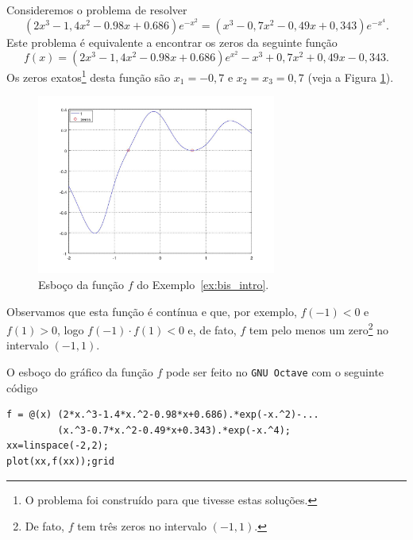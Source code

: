 \begin{ex}\label{ex:bis_intro}
  Consideremos o problema de resolver
  \begin{equation}
    (2x^3-1,4x^2-0.98x+0.686)e^{-x^2} = (x^3-0,7x^2-0,49x+0,343)e^{-x^4}.
  \end{equation}
Este problema é equivalente a encontrar os zeros da seguinte função
\begin{equation}
  f(x) = (2x^3-1,4x^2-0.98x+0.686)e^{x^2} - x^3 + 0,7x^2 + 0,49x - 0,343.
\end{equation}
Os zeros exatos\footnote{O problema foi construído para que tivesse estas soluções.} desta função são $x_1=-0,7$ e $x_2=x_3=0,7$ (veja a Figura \ref{fig:bis_intro}).

\begin{figure}[h!]
  \centering
  \includegraphics[width=0.7\textwidth]{./cap_eq1d/dados/ex_bis_intro/fig_bis_intro}
  \caption{Esboço da função $f$ do Exemplo~\ref{ex:bis_intro}.}
  \label{fig:bis_intro}
\end{figure}

Observamos que esta função é contínua e que, por exemplo, $f(-1)<0$ e $f(1)>0$, logo $f(-1)\cdot f(1) < 0$ e, de fato, $f$ tem pelo menos um zero\footnote{De fato, $f$ tem três zeros no intervalo $(-1, 1)$.} no intervalo $(-1, 1)$.

\ifisoctave
O esboço do gráfico da função $f$ pode ser feito no \verb+GNU Octave+ com o seguinte código
\begin{verbatim}
f = @(x) (2*x.^3-1.4*x.^2-0.98*x+0.686).*exp(-x.^2)-...
         (x.^3-0.7*x.^2-0.49*x+0.343).*exp(-x.^4);
xx=linspace(-2,2);
plot(xx,f(xx));grid
\end{verbatim}
\fi
\end{ex}

